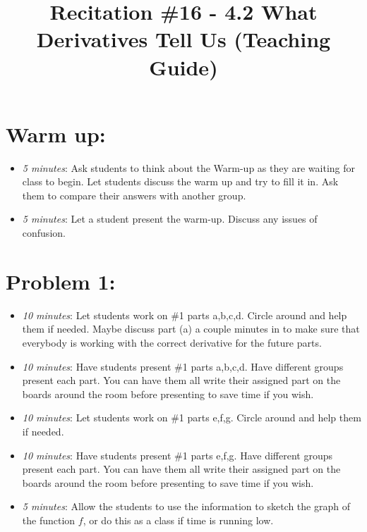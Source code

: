 \documentclass[handout,nooutcomes]{ximera}
\title{Recitation \#16 - 4.2 What Derivatives Tell Us (Teaching Guide)}
\begin{document}
\begin{abstract}		\end{abstract}
\maketitle


\section*{Warm up:} 
	
	\begin{itemize}
	
	\item  \emph{5 minutes}:  Ask students to think about the Warm-up as they are waiting for class to begin.  Let students discuss the warm up and try to fill it in.  Ask them to compare their answers with another group. 
	
	\item  \emph{5 minutes}:  Let a student present the warm-up.  Discuss any issues of confusion.
	
	\end{itemize}


\section*{Problem 1:}

	\begin{itemize}
	
	\item  \emph{10 minutes}:  Let students work on \#1 parts a,b,c,d.  Circle around and help them if needed.  Maybe discuss part (a) a couple minutes in to make sure that everybody is working with the correct derivative for the future parts.
	
	\item  \emph{10 minutes}:  Have students present \#1 parts a,b,c,d.  Have different groups present each part.   You can have them all write their assigned part on the boards around the room before presenting to save time if you wish.
	
	\item  \emph{10 minutes}:  Let students work on \#1 parts e,f,g.  Circle around and help them if needed.
	
	\item  \emph{10 minutes}:  Have students present \#1 parts e,f,g.  Have different groups present each part.   You can have them all write their assigned part on the boards around the room before presenting to save time if you wish.
	
	\item  \emph{5 minutes}:  Allow the students to use the information to sketch the graph of the function $f$, or do this as a class if time is running low.
	
	\end{itemize}




	
	
	

	
	

	
	
	

	
	
	
\end{document}
